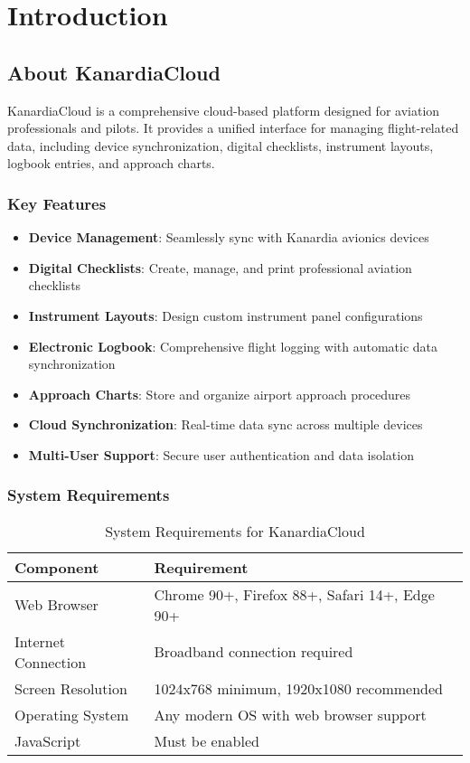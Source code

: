 \chapter{Introduction}

\section{About KanardiaCloud}

KanardiaCloud is a comprehensive cloud-based platform designed for aviation professionals and pilots. It provides a unified interface for managing flight-related data, including device synchronization, digital checklists, instrument layouts, logbook entries, and approach charts.

\subsection{Key Features}

\begin{itemize}[leftmargin=2cm]
    \item \textbf{Device Management}: Seamlessly sync with Kanardia avionics devices
    \item \textbf{Digital Checklists}: Create, manage, and print professional aviation checklists
    \item \textbf{Instrument Layouts}: Design custom instrument panel configurations
    \item \textbf{Electronic Logbook}: Comprehensive flight logging with automatic data synchronization
    \item \textbf{Approach Charts}: Store and organize airport approach procedures
    \item \textbf{Cloud Synchronization}: Real-time data sync across multiple devices
    \item \textbf{Multi-User Support}: Secure user authentication and data isolation
\end{itemize}

\subsection{System Requirements}

\begin{table}[H]
\centering
\begin{tabular}{@{}ll@{}}
\toprule
\textbf{Component} & \textbf{Requirement} \\
\midrule
Web Browser & Chrome 90+, Firefox 88+, Safari 14+, Edge 90+ \\
Internet Connection & Broadband connection required \\
Screen Resolution & 1024x768 minimum, 1920x1080 recommended \\
Operating System & Any modern OS with web browser support \\
JavaScript & Must be enabled \\
\bottomrule
\end{tabular}
\caption{System Requirements for KanardiaCloud}
\label{tab:system_requirements}
\end{table}

